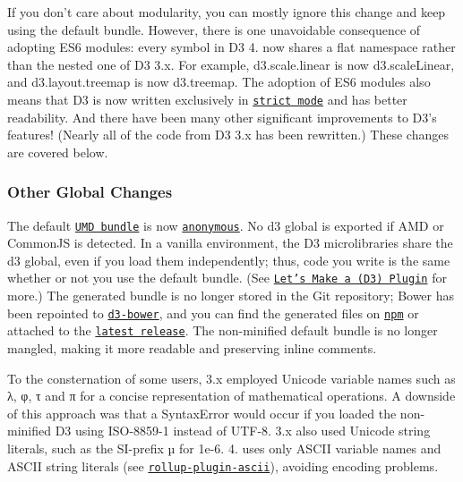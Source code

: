 If you don’t care about modularity, you can mostly ignore this change and keep using the default bundle. However, there is one unavoidable consequence of adopting E\+S6 modules\+: every symbol in D3 4. now shares a flat namespace rather than the nested one of D3 3.\+x. For example, d3.\+scale.\+linear is now d3.\+scale\+Linear, and d3.\+layout.\+treemap is now d3.\+treemap. The adoption of E\+S6 modules also means that D3 is now written exclusively in \href{https://developer.mozilla.org/en-US/docs/Web/JavaScript/Reference/Strict_mode}{\tt strict mode} and has better readability. And there have been many other significant improvements to D3’s features! (Nearly all of the code from D3 3.\+x has been rewritten.) These changes are covered below.

\subsubsection*{Other Global Changes}

The default \href{https://github.com/umdjs/umd}{\tt U\+MD bundle} is now \href{https://github.com/requirejs/requirejs/wiki/Updating-existing-libraries#register-as-an-anonymous-module-}{\tt anonymous}. No {\ttfamily d3} global is exported if A\+MD or Common\+JS is detected. In a vanilla environment, the D3 microlibraries share the {\ttfamily d3} global, even if you load them independently; thus, code you write is the same whether or not you use the default bundle. (See \href{https://bost.ocks.org/mike/d3-plugin/}{\tt Let’s Make a (D3) Plugin} for more.) The generated bundle is no longer stored in the Git repository; Bower has been repointed to \href{https://github.com/mbostock-bower/d3-bower}{\tt d3-\/bower}, and you can find the generated files on \href{https://unpkg.com/d3}{\tt npm} or attached to the \href{https://github.com/d3/d3/releases/latest}{\tt latest release}. The non-\/minified default bundle is no longer mangled, making it more readable and preserving inline comments.

To the consternation of some users, 3.\+x employed Unicode variable names such as λ, φ, τ and π for a concise representation of mathematical operations. A downside of this approach was that a Syntax\+Error would occur if you loaded the non-\/minified D3 using I\+S\+O-\/8859-\/1 instead of U\+T\+F-\/8. 3.\+x also used Unicode string literals, such as the S\+I-\/prefix µ for 1e-\/6. 4. uses only A\+S\+C\+II variable names and A\+S\+C\+II string literals (see \href{https://github.com/mbostock/rollup-plugin-ascii}{\tt rollup-\/plugin-\/ascii}), avoiding encoding problems.

